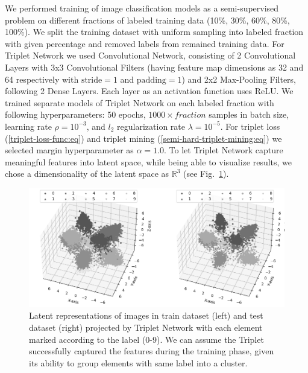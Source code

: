 We performed training of image classification models as a semi-supervised problem on different fractions of labeled training data (10\%, 30\%, 60\%, 80\%, 100\%). We split the training dataset with uniform sampling into labeled fraction with given percentage and removed labels from remained training data. For Triplet Network we used Convolutional Network, consisting of 2 Convolutional Layers with 3x3 Convolutional Filters (having feature map dimensions as 32 and 64 respectively with $\text{stride}=1$ and $\text{padding}=1$) and 2x2 Max-Pooling Filters, following 2 Dense Layers. Each layer as an activation function uses ReLU. We trained separate models of Triplet Network on each labeled fraction with following hyperparameters: 50 epochs, $1000 \times fraction$ samples in batch size, learning rate $ \rho = 10^{-3} $, and $ l_2 $ regularization rate $ \lambda = 10^{-5} $. For triplet loss (\ref{triplet-loss-func:eq}) and triplet mining (\ref{semi-hard-triplet-mining:eq}) we selected margin hyperparameter as $\alpha = 1.0$. To let Triplet Network capture meaningful features into latent space, while being able to visualize results, we chose a dimensionality of the latent space as $\mathbb{R}^3$ (see Fig.~\ref{latent-space:fig}).

\begin{figure}
    \centering
    \includegraphics[width=\textwidth]{figures/latent_space.png}
    \caption{Latent representations of images in train dataset (left) and test dataset (right) projected by Triplet Network with each element marked according to the label (0-9). We can assume the Triplet  successfully captured the features during the training phase, given its ability to group elements with same label into a cluster.} \label{latent-space:fig}
\end{figure}

